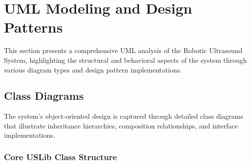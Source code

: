 \section{UML Modeling and Design Patterns}
\label{sec:uml_modeling}

This section presents a comprehensive UML analysis of the Robotic Ultrasound System, highlighting the structural and behavioral aspects of the system through various diagram types and design pattern implementations.

\subsection{Class Diagrams}
\label{subsec:class_diagrams}

The system's object-oriented design is captured through detailed class diagrams that illustrate inheritance hierarchies, composition relationships, and interface implementations.

\subsubsection{Core USLib Class Structure}

